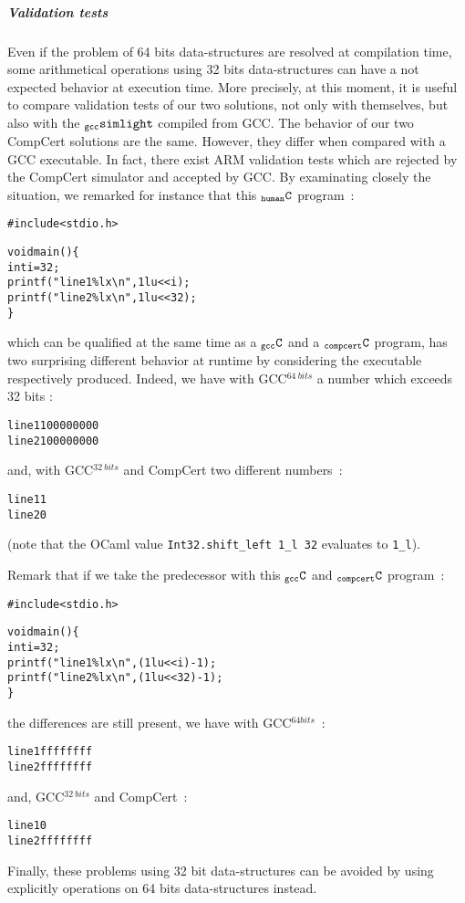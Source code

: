 \documentclass[a4paper, 11pt]{article}
\newenvironment{bash}
  {%
   \begin{alltt}
   \footnotesize}
  {\end{alltt} %
  }
\newenvironment{humC}
  {%
   \begin{alltt}
   \footnotesize}
  {\end{alltt} %
  }
\newcommand{\gccSL}{$_{\tt gcc}{\tt simlight}$\xspace}
\newcommand{\C}{$_{\tt compcert}{\tt C}$\xspace}
\newcommand{\gccC}{$_{\tt gcc}{\tt C}$\xspace}
\newcommand{\hC}{$_{\tt human}{\tt C}$\xspace}
\begin{document}
\subparagraph{Validation tests}
Even if the problem of 64 bits data-structures are resolved at compilation time, some arithmetical operations using 32 bits data-structures can have a not expected behavior at execution time.
More precisely, at this moment, it is useful to compare validation tests of our two solutions, not only with themselves, but also with the \gccSL compiled from GCC.
The behavior of our two CompCert solutions are the same. However, they differ when compared with a GCC executable. In fact, there exist ARM validation tests which are rejected by the CompCert simulator and accepted by GCC.
By examinating closely the situation, we remarked for instance that this \hC program~:
\begin{humC}
#include <stdio.h>

void main() \{
  int i = 32;
  printf("line1 \%lx\textbackslash{}n", 1lu << i);
  printf("line2 \%lx\textbackslash{}n", 1lu << 32);
\}
\end{humC}
which can be qualified at the same time as a \gccC and a \C program, has two surprising different behavior at runtime by considering the executable respectively produced. Indeed, we have with GCC$^{64~bits}$ a number which exceeds 32 bits :
\begin{bash}
line1 100000000
line2 100000000
\end{bash}
and, with GCC$^{32~bits}$ and CompCert two different numbers~:
\begin{bash}
line1 1
line2 0
\end{bash}
(note that the OCaml value \verb|Int32.shift_left 1_l 32| evaluates to \verb|1_l|).

Remark that if we take the predecessor with this \gccC and \C program~:
\begin{humC}
#include <stdio.h>

void main() \{
  int i = 32;
  printf("line1 \%lx\textbackslash{}n", (1lu << i) - 1);
  printf("line2 \%lx\textbackslash{}n", (1lu << 32) - 1);
\}
\end{humC}
the differences are still present, we have with GCC$^{64 bits}$~:
\begin{bash}
line1 ffffffff
line2 ffffffff
\end{bash}
and, GCC$^{32~bits}$ and CompCert~:
\begin{bash}
line1 0
line2 ffffffff
\end{bash}
Finally, these problems using 32 bit data-structures can be avoided by using explicitly operations on 64 bits data-structures instead.
\end{document}
